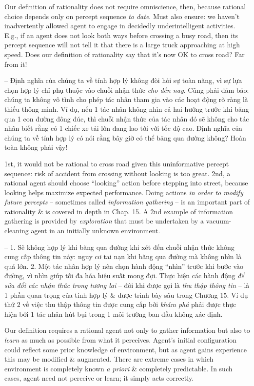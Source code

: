 \documentclass{article}
\begin{document}
\begin{itemize}
\begin{itemize}
\begin{itemize}
\begin{itemize}
				Our definition of rationality does not require omniscience, then, because rational choice depends only on percept sequence {\it to date}. Must also ensure: we haven't inadvertently allowed agent to engage in decidedly underintelligent activities. E.g., if an agent does not look both ways before crossing a busy road, then its percept sequence will not tell it that there is a large truck approaching at high speed. Does our definition of rationality say that it's now OK to cross road? Far from it!
				
				-- Định nghĩa của chúng ta về tính hợp lý không đòi hỏi sự toàn năng, vì sự lựa chọn hợp lý chỉ phụ thuộc vào chuỗi nhận thức {\it cho đến nay}. Cũng phải đảm bảo: chúng ta không vô tình cho phép tác nhân tham gia vào các hoạt động rõ ràng là thiếu thông minh. Ví dụ, nếu 1 tác nhân không nhìn cả hai hướng trước khi băng qua 1 con đường đông đúc, thì chuỗi nhận thức của tác nhân đó sẽ không cho tác nhân biết rằng có 1 chiếc xe tải lớn đang lao tới với tốc độ cao. Định nghĩa của chúng ta về tính hợp lý có nói rằng bây giờ có thể băng qua đường không? Hoàn toàn không phải vậy!
				
				1st, it would not be rational to cross road given this uninformative percept sequence: risk of accident from crossing without looking is too great. 2nd, a rational agent should choose ``looking'' action before stepping into street, because looking helps maximize expected performance. Doing actions {\it in order to modify future percepts} -- sometimes called {\it information gathering} -- is an important part of rationality \& is covered in depth in Chap. 15. A 2nd example of information gathering is provided by {\it exploration} that must be undertaken by a vacuum-cleaning agent in an initially unknown environment.
				
				-- 1. Sẽ không hợp lý khi băng qua đường khi xét đến chuỗi nhận thức không cung cấp thông tin này: nguy cơ tai nạn khi băng qua đường mà không nhìn là quá lớn. 2. Một tác nhân hợp lý nên chọn hành động ``nhìn'' trước khi bước vào đường, vì nhìn giúp tối đa hóa hiệu suất mong đợi. Thực hiện các hành động {\it để sửa đổi các nhận thức trong tương lai} -- đôi khi được gọi là {\it thu thập thông tin} -- là 1 phần quan trọng của tính hợp lý \& được trình bày sâu trong Chương 15. Ví dụ thứ 2 về việc thu thập thông tin được cung cấp bởi {\it khám phá} phải được thực hiện bởi 1 tác nhân hút bụi trong 1 môi trường ban đầu không xác định.
				
				Our definition requires a rational agent not only to gather information but also to {\it learn} as much as possible from what it perceives. Agent's initial configuration could reflect some prior knowledge of environment, but as agent gains experience this may be modified \& augmented. There are extreme cases in which environment is completely known {\it a priori} \& completely predictable. In such cases, agent need not perceive or learn; it simply acts correctly.
				

\end{itemize}
\end{itemize}
\end{itemize}
\end{itemize}
\end{document}
